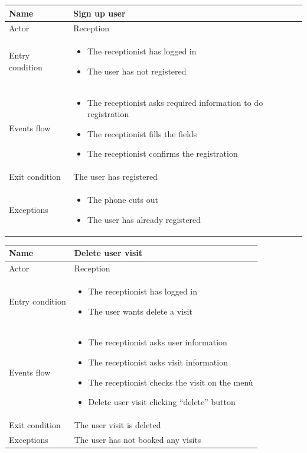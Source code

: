  \begin{tabular}{|p{5cm} | p{7cm} | }
 	\hline
 	Name & Sign up user  \\
 	\hline
 	Actor & Reception \\
 	\hline
 	Entry condition &
 	\begin{itemize}
 		\item The receptionist has logged in 
 		\item The user has not registered
 	\end{itemize} \\
 	\hline
 	Events flow & 
 	\begin{itemize}
 		\item The receptionist asks required information to do registration
 		\item The receptionist fills the fields
 		\item The receptionist confirms the registration
 	\end{itemize} \\
 	\hline
 	Exit condition &
 	The user has registered \\
 	\hline 
 	Exceptions & 
 	\begin{itemize}
 		\item The phone cuts out
 		\item The user has already registered
 	\end{itemize} \\
 	\hline
 \end{tabular}

\begin{tabular}{|p{5cm} | p{7cm} | }
	\hline
	Name & Delete user visit  \\
	\hline
	Actor & Reception \\
	\hline
	Entry condition &
	\begin{itemize}
		\item The receptionist has logged in 
		\item The user wants delete a visit
	\end{itemize} \\
	\hline
	Events flow & 
	\begin{itemize}
		\item The receptionist asks user information
		\item The receptionist asks visit information
		\item The receptionist checks the visit on the menù
		\item Delete user visit clicking “delete” button
	\end{itemize} \\
	\hline
	Exit condition &
	The user visit is deleted\\
	\hline 
	Exceptions & 
	The user has not booked any visits \\
	\hline
\end{tabular}

